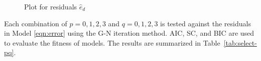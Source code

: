 \documentclass[review,3p,times,12pt,number]{elsarticle}
\begin{document}
\begin{figure}[htbp]
\centering
{}
\caption{Plot for residuals $\hat{e}_d$}
\end{figure}

Each combination of $p=0,1,2,3$ and $q=0,1,2,3$ is tested against the residuals in Model \ref{eqn:error} using the G-N iteration method. AIC, SC, and BIC are used to evaluate the fitness of models. The results are summarized in Table~\ref{tab:select-pq}.
\end{document}
